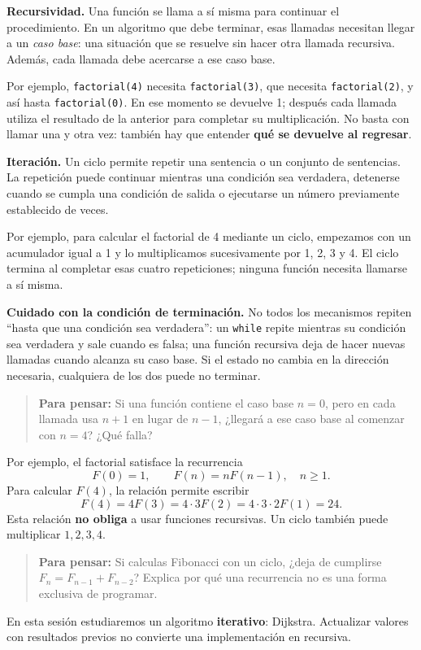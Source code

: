\documentclass[11pt,letterpaper]{article}
\newcommand{\pregunta}[1]{\begin{quote}\color{verde}\textbf{Para pensar:} #1\end{quote}}
\begin{document}
\textbf{Recursividad.} Una función se llama a sí misma para continuar el procedimiento. En un algoritmo que debe terminar, esas llamadas necesitan llegar a un \emph{caso base}: una situación que se resuelve sin hacer otra llamada recursiva. Además, cada llamada debe acercarse a ese caso base.

Por ejemplo, \texttt{factorial(4)} necesita \texttt{factorial(3)}, que necesita \texttt{factorial(2)}, y así hasta \texttt{factorial(0)}. En ese momento se devuelve 1; después cada llamada utiliza el resultado de la anterior para completar su multiplicación. No basta con llamar una y otra vez: también hay que entender \textbf{qué se devuelve al regresar}.

\textbf{Iteración.} Un ciclo permite repetir una sentencia o un conjunto de sentencias. La repetición puede continuar mientras una condición sea verdadera, detenerse cuando se cumpla una condición de salida o ejecutarse un número previamente establecido de veces.

Por ejemplo, para calcular el factorial de 4 mediante un ciclo, empezamos con un acumulador igual a 1 y lo multiplicamos sucesivamente por 1, 2, 3 y 4. El ciclo termina al completar esas cuatro repeticiones; ninguna función necesita llamarse a sí misma.

\textbf{Cuidado con la condición de terminación.} No todos los mecanismos repiten ``hasta que una condición sea verdadera'': un \texttt{while} repite mientras su condición sea verdadera y sale cuando es falsa; una función recursiva deja de hacer nuevas llamadas cuando alcanza su caso base. Si el estado no cambia en la dirección necesaria, cualquiera de los dos puede no terminar.

\pregunta{Si una función contiene el caso base $n=0$, pero en cada llamada usa $n+1$ en lugar de $n-1$, ¿llegará a ese caso base al comenzar con $n=4$? ¿Qué falla?}

Por ejemplo, el factorial satisface la recurrencia
\[
F(0)=1,\qquad F(n)=nF(n-1),\quad n\geq1.
\]
Para calcular $F(4)$, la relación permite escribir
\[
F(4)=4F(3)=4\cdot3F(2)=4\cdot3\cdot2F(1)=24.
\]
Esta relación \textbf{no obliga} a usar funciones recursivas. Un ciclo también puede multiplicar $1,2,3,4$.

\pregunta{Si calculas Fibonacci con un ciclo, ¿deja de cumplirse $F_n=F_{n-1}+F_{n-2}$? Explica por qué una recurrencia no es una forma exclusiva de programar.}
En esta sesión estudiaremos un algoritmo \textbf{iterativo}: Dijkstra. Actualizar valores con resultados previos no convierte una implementación en recursiva.
\end{document}

